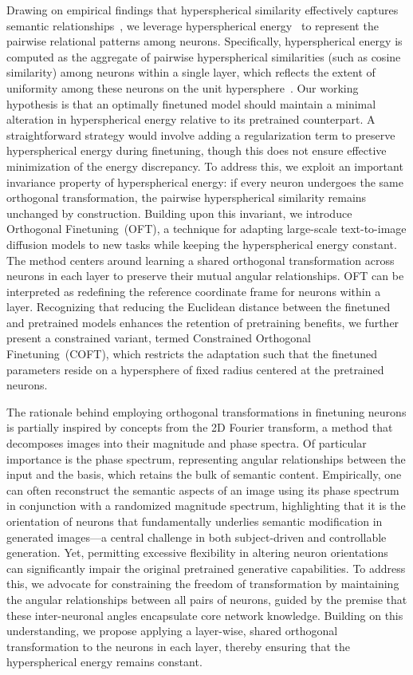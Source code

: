 Drawing on empirical findings that hyperspherical similarity effectively captures semantic relationships~\cite{liu2017deep,liu2018decoupled,chen2020angular}, we leverage hyperspherical energy~\cite{liu2018learning} to represent the pairwise relational patterns among neurons. Specifically, hyperspherical energy is computed as the aggregate of pairwise hyperspherical similarities (such as cosine similarity) among neurons within a single layer, which reflects the extent of uniformity among these neurons on the unit hypersphere~\cite{liu2021learning}. Our working hypothesis is that an optimally finetuned model should maintain a minimal alteration in hyperspherical energy relative to its pretrained counterpart. A straightforward strategy would involve adding a regularization term to preserve hyperspherical energy during finetuning, though this does not ensure effective minimization of the energy discrepancy. To address this, we exploit an important invariance property of hyperspherical energy: if every neuron undergoes the same orthogonal transformation, the pairwise hyperspherical similarity remains unchanged by construction. Building upon this invariant, we introduce Orthogonal Finetuning~(OFT), a technique for adapting large-scale text-to-image diffusion models to new tasks while keeping the hyperspherical energy constant. The method centers around learning a shared orthogonal transformation across neurons in each layer to preserve their mutual angular relationships. OFT can be interpreted as redefining the reference coordinate frame for neurons within a layer. Recognizing that reducing the Euclidean distance between the finetuned and pretrained models enhances the retention of pretraining benefits, we further present a constrained variant, termed Constrained Orthogonal Finetuning~(COFT), which restricts the adaptation such that the finetuned parameters reside on a hypersphere of fixed radius centered at the pretrained neurons.

The rationale behind employing orthogonal transformations in finetuning neurons is partially inspired by concepts from the 2D Fourier transform, a method that decomposes images into their magnitude and phase spectra. Of particular importance is the phase spectrum, representing angular relationships between the input and the basis, which retains the bulk of semantic content. Empirically, one can often reconstruct the semantic aspects of an image using its phase spectrum in conjunction with a randomized magnitude spectrum, highlighting that it is the orientation of neurons that fundamentally underlies semantic modification in generated images—a central challenge in both subject-driven and controllable generation. Yet, permitting excessive flexibility in altering neuron orientations can significantly impair the original pretrained generative capabilities. To address this, we advocate for constraining the freedom of transformation by maintaining the angular relationships between all pairs of neurons, guided by the premise that these inter-neuronal angles encapsulate core network knowledge. Building on this understanding, we propose applying a layer-wise, shared orthogonal transformation to the neurons in each layer, thereby ensuring that the hyperspherical energy remains constant.

